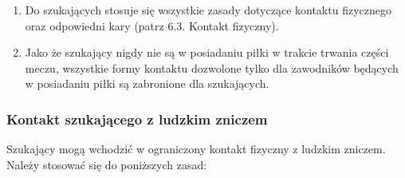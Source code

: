 \documentclass[12pt]{article}
\begin{document}
\begin{enumerate}
	\item
	      Do szukających stosuje się wszystkie zasady dotyczące kontaktu
	      fizycznego oraz odpowiedni kary (patrz 6.3. Kontakt fizyczny).
	\item
	      Jako że szukający nigdy nie są w posiadaniu piłki w trakcie trwania
	      części meczu, wszystkie formy kontaktu dozwolone tylko dla zawodników
	      będących w posiadaniu piłki są zabronione dla szukających.
\end{enumerate}

\subsubsection{Kontakt szukającego z ludzkim zniczem}

Szukający mogą wchodzić w ograniczony kontakt fizyczny z ludzkim
zniczem. Należy stosować się do poniższych zasad:
\end{document}
